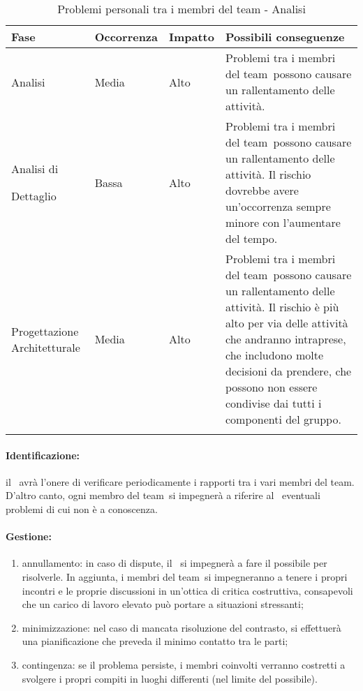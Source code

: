 \documentclass[../PianoProgetto.tex]{subfiles}
\begin{document}
	\begin{table}[h]
		\centering
		\begin{tabularx}{\textwidth}{F O O P}
			\toprule
			\textbf{Fase} & \textbf{Occorrenza} & \textbf{Impatto} & \textbf{Possibili conseguenze}\\
			\midrule
			Analisi & Media & Alto & Problemi tra i membri del team\g\ possono causare un rallentamento delle attività. \\
			\midrule
			Analisi di \par Dettaglio & Bassa & Alto & Problemi tra i membri del team\g\ possono causare un rallentamento delle attività. Il rischio dovrebbe avere un'occorrenza sempre minore con l'aumentare del tempo. \\
			\midrule
			Progettazione Architetturale & Media & Alto & Problemi tra i membri del team\g\ possono causare un rallentamento delle attività. Il rischio è più alto per via delle attività che andranno intraprese, che includono molte decisioni da prendere, che possono non essere condivise dai tutti i componenti del gruppo. \\
			\bottomrule
		\end{tabularx}
		\caption{Problemi personali tra i membri del team - Analisi}
		\label{tab:Problemi personali tra i membri del team - Analisi}	
	\end{table}
	
	\paragraph*{Identificazione:} il \responsabilediprogetto\ avrà l'onere di verificare periodicamente i rapporti tra i vari membri del team\g. D'altro canto, ogni membro del team\g\ si impegnerà a riferire al \responsabilediprogetto\ eventuali problemi di cui non è a conoscenza.
	
	\paragraph*{Gestione:}
	\begin{enumerate}
		\item annullamento: in caso di dispute, il \responsabilediprogetto\ si impegnerà a fare il possibile per risolverle. In aggiunta, i membri del team\g\ si impegneranno a tenere i propri incontri e le proprie discussioni in un'ottica di critica costruttiva, consapevoli che un carico di lavoro elevato può portare a situazioni stressanti;
		\item minimizzazione: nel caso di mancata risoluzione del contrasto, si effettuerà una pianificazione che preveda il minimo contatto tra le parti; 
		\item contingenza: se il problema persiste, i membri coinvolti verranno costretti a svolgere i propri compiti in luoghi differenti (nel limite del possibile).
	\end{enumerate}	
	
\end{document}
